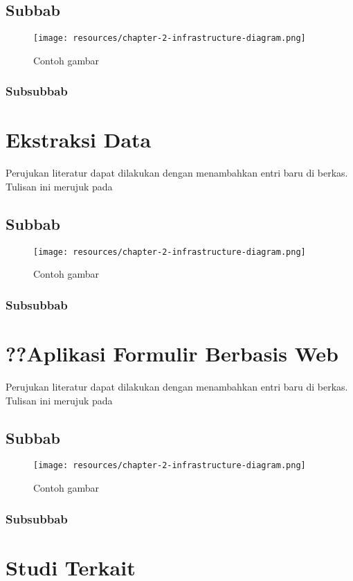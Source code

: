    \subsection{Subbab}

    \blindtext

    \begin{figure}[h]
        \centering
        \texttt{[image: resources/chapter-2-infrastructure-diagram.png]}
        \caption{Contoh gambar}
    \end{figure}

    \subsubsection{Subsubbab}

    \blindtext

\section{Ekstraksi Data}
Perujukan literatur \parencite{knuth2008art} dapat dilakukan dengan menambahkan entri baru di berkas. Tulisan ini merujuk pada \parencite{knuth2001art}

    \subsection{Subbab}

    \blindtext

    \begin{figure}[h]
        \centering
        \texttt{[image: resources/chapter-2-infrastructure-diagram.png]}
        \caption{Contoh gambar}
    \end{figure}

    \subsubsection{Subsubbab}

    \blindtext

\section{??Aplikasi Formulir Berbasis Web}
Perujukan literatur \parencite{knuth2008art} dapat dilakukan dengan menambahkan entri baru di berkas. Tulisan ini merujuk pada \parencite{knuth2001art}

    \subsection{Subbab}

    \blindtext

    \begin{figure}[h]
        \centering
        \texttt{[image: resources/chapter-2-infrastructure-diagram.png]}
        \caption{Contoh gambar}
    \end{figure}

    \subsubsection{Subsubbab}

    \blindtext

\section{Studi Terkait}
\blindtext

